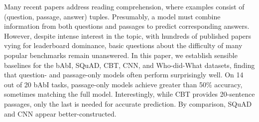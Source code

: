 Many recent papers address reading comprehension, where examples consist of (question, passage, answer) tuples. Presumably, a model must combine information from both questions and passages to predict corresponding answers. However, despite intense interest in the topic, with hundreds of published papers vying for leaderboard dominance, basic questions about the difficulty of many popular benchmarks remain unanswered. In this paper, we establish sensible baselines for the bAbI, SQuAD, CBT, CNN, and Who-did-What datasets, finding that question- and passage-only models often perform surprisingly well. On 14 out of 20 bAbI tasks, passage-only models achieve greater than 50\% accuracy, sometimes matching the full model. Interestingly, while CBT provides 20-sentence passages, only the last is needed for accurate prediction. By comparison, SQuAD and CNN appear better-constructed.
